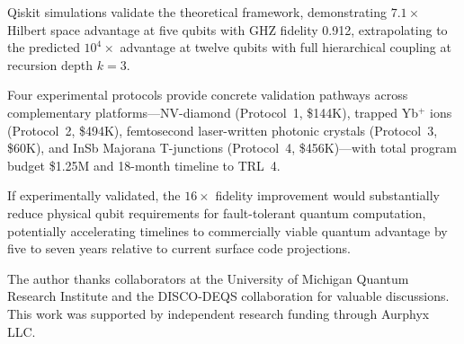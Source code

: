 \documentclass[aps,prx,twocolumn,groupedaddress,longbibliography]{revtex4-2}
\theoremstyle{plain}
\theoremstyle{definition}
\begin{document}
Qiskit simulations validate the theoretical framework, demonstrating $7.1\times$ Hilbert space advantage at five qubits with GHZ fidelity 0.912, extrapolating to the predicted $10^4\times$ advantage at twelve qubits with full hierarchical coupling at recursion depth $k = 3$.

Four experimental protocols provide concrete validation pathways across complementary platforms---NV-diamond (Protocol~1, \$144K), trapped Yb$^+$ ions (Protocol~2, \$494K), femtosecond laser-written photonic crystals (Protocol~3, \$60K), and InSb Majorana T-junctions (Protocol~4, \$456K)---with total program budget \$1.25M and 18-month timeline to TRL~4.

If experimentally validated, the $16\times$ fidelity improvement would substantially reduce physical qubit requirements for fault-tolerant quantum computation, potentially accelerating timelines to commercially viable quantum advantage by five to seven years relative to current surface code projections.

\begin{acknowledgments}
The author thanks collaborators at the University of Michigan Quantum Research Institute and the DISCO-DEQS collaboration for valuable discussions. This work was supported by independent research funding through Aurphyx LLC.
\end{acknowledgments}




\end{document}
